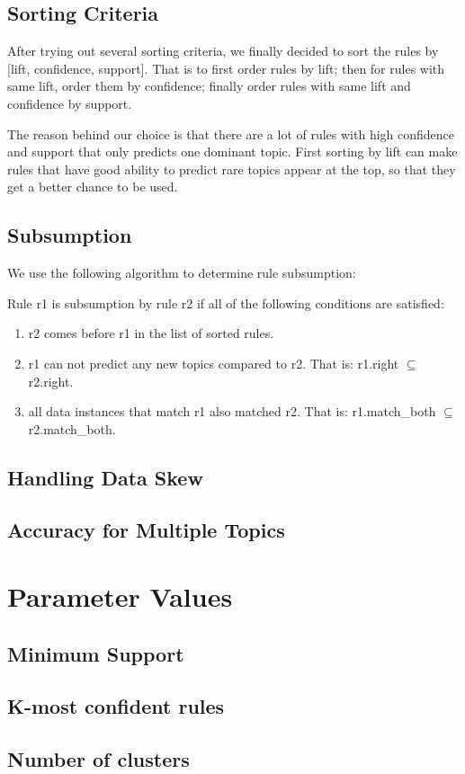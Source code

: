 \documentclass{article}
\begin{document}
\subsection{Sorting Criteria}
After trying out several sorting criteria, we finally decided to sort the rules
by [lift, confidence, support]. That is to first order rules by lift; then for
rules with same lift, order them by confidence; finally order rules with same
lift and confidence by support.

The reason behind our choice is that there are a lot of rules with
high confidence and support that only predicts one dominant topic. First sorting
by lift can make rules that have good ability to predict rare topics
appear at the top, so that they get a better chance to be used.

\subsection{Subsumption}
We use the following algorithm to determine rule subsumption:

Rule r1 is subsumption by rule r2 if all of the following conditions are
satisfied:
\begin{enumerate}
  \item r2 comes before r1 in the list of sorted rules.
  \item r1 can not predict any new topics compared to r2. That is: r1.right
  $\subseteq$ r2.right.
  \item all data instances that match r1 also matched r2. That is:
  r1.match\_both $\subseteq$ r2.match\_both.
\end{enumerate}

\subsection{Handling Data Skew}

\subsection{Accuracy for Multiple Topics}


\section{Parameter Values}
\subsection{Minimum Support}
\subsection{K-most confident rules}
\subsection{Number of clusters}


\end{document}
